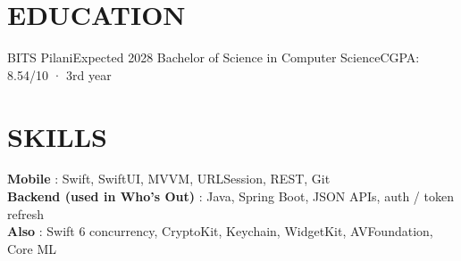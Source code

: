 \section{EDUCATION}
  \resumeSubHeadingListStart
    \resumeSubheading
      {BITS Pilani}{Expected 2028}
      {Bachelor of Science in Computer Science}{CGPA: 8.54/10 · 3rd year}
  \resumeSubHeadingListEnd

\section{SKILLS}
 \begin{itemize}[leftmargin=0in, label={}]
    \small{\item{
     \textbf{Mobile} {: Swift, SwiftUI, MVVM, URLSession, REST, Git} \vspace{1pt} \\
     \textbf{Backend (used in Who's Out)} {: Java, Spring Boot, JSON APIs, auth / token refresh} \vspace{1pt} \\
     \textbf{Also} {: Swift 6 concurrency, CryptoKit, Keychain, WidgetKit, AVFoundation, Core ML}
    }}
 \end{itemize}


